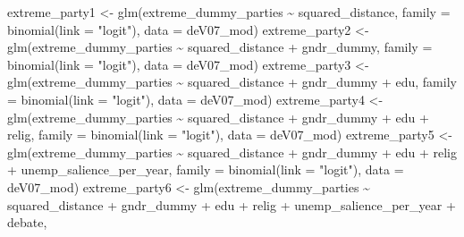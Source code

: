 \documentclass[
]{article}
\newenvironment{Shaded}{\begin{snugshade}}{\end{snugshade}}
\newcommand{\AttributeTok}[1]{\textcolor[rgb]{0.77,0.63,0.00}{#1}}
\newcommand{\FunctionTok}[1]{\textcolor[rgb]{0.00,0.00,0.00}{#1}}
\newcommand{\NormalTok}[1]{#1}
\newcommand{\OtherTok}[1]{\textcolor[rgb]{0.56,0.35,0.01}{#1}}
\newcommand{\SpecialCharTok}[1]{\textcolor[rgb]{0.00,0.00,0.00}{#1}}
\newcommand{\StringTok}[1]{\textcolor[rgb]{0.31,0.60,0.02}{#1}}
\begin{document}
\begin{Shaded}
\begin{Highlighting}[]
\NormalTok{extreme\_party1 }\OtherTok{\textless{}{-}} \FunctionTok{glm}\NormalTok{(extreme\_dummy\_parties }\SpecialCharTok{\textasciitilde{}}\NormalTok{ squared\_distance, }
                     \AttributeTok{family =} \FunctionTok{binomial}\NormalTok{(}\AttributeTok{link =} \StringTok{"logit"}\NormalTok{),}
                     \AttributeTok{data =}\NormalTok{ deV07\_mod)}
\NormalTok{extreme\_party2 }\OtherTok{\textless{}{-}} \FunctionTok{glm}\NormalTok{(extreme\_dummy\_parties }\SpecialCharTok{\textasciitilde{}}\NormalTok{ squared\_distance }\SpecialCharTok{+}\NormalTok{ gndr\_dummy, }
                     \AttributeTok{family =} \FunctionTok{binomial}\NormalTok{(}\AttributeTok{link =} \StringTok{"logit"}\NormalTok{),}
                     \AttributeTok{data =}\NormalTok{ deV07\_mod)}
\NormalTok{extreme\_party3 }\OtherTok{\textless{}{-}} \FunctionTok{glm}\NormalTok{(extreme\_dummy\_parties }\SpecialCharTok{\textasciitilde{}}\NormalTok{ squared\_distance }\SpecialCharTok{+}\NormalTok{ gndr\_dummy }\SpecialCharTok{+}\NormalTok{ edu, }
                     \AttributeTok{family =} \FunctionTok{binomial}\NormalTok{(}\AttributeTok{link =} \StringTok{"logit"}\NormalTok{),}
                     \AttributeTok{data =}\NormalTok{ deV07\_mod)}
\NormalTok{extreme\_party4 }\OtherTok{\textless{}{-}} \FunctionTok{glm}\NormalTok{(extreme\_dummy\_parties }\SpecialCharTok{\textasciitilde{}}\NormalTok{ squared\_distance }\SpecialCharTok{+}\NormalTok{ gndr\_dummy }\SpecialCharTok{+}\NormalTok{ edu }\SpecialCharTok{+}\NormalTok{ relig, }
                     \AttributeTok{family =} \FunctionTok{binomial}\NormalTok{(}\AttributeTok{link =} \StringTok{"logit"}\NormalTok{),}
                     \AttributeTok{data =}\NormalTok{ deV07\_mod)}
\NormalTok{extreme\_party5 }\OtherTok{\textless{}{-}} \FunctionTok{glm}\NormalTok{(extreme\_dummy\_parties }\SpecialCharTok{\textasciitilde{}}\NormalTok{ squared\_distance }\SpecialCharTok{+}\NormalTok{ gndr\_dummy }\SpecialCharTok{+}\NormalTok{ edu }\SpecialCharTok{+}\NormalTok{ relig }\SpecialCharTok{+}\NormalTok{ unemp\_salience\_per\_year, }
                     \AttributeTok{family =} \FunctionTok{binomial}\NormalTok{(}\AttributeTok{link =} \StringTok{"logit"}\NormalTok{),}
                     \AttributeTok{data =}\NormalTok{ deV07\_mod)}
\NormalTok{extreme\_party6 }\OtherTok{\textless{}{-}} \FunctionTok{glm}\NormalTok{(extreme\_dummy\_parties }\SpecialCharTok{\textasciitilde{}}\NormalTok{ squared\_distance }\SpecialCharTok{+}\NormalTok{ gndr\_dummy }\SpecialCharTok{+}\NormalTok{ edu }\SpecialCharTok{+}\NormalTok{ relig }\SpecialCharTok{+}\NormalTok{ unemp\_salience\_per\_year }\SpecialCharTok{+}\NormalTok{ debate, }

\end{Highlighting}
\end{Shaded}
\end{document}
